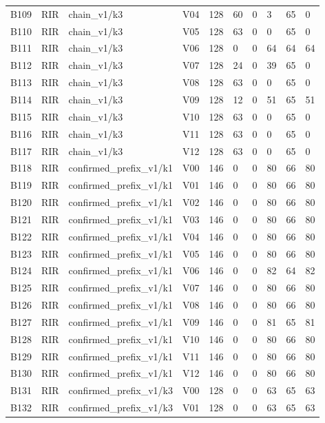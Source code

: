 \begin{longtable}{llllllllll}
B109 & RIR & chain\_v1/k3 & V04 & 128 & 60 & 0 & 3 & 65 & 0 \\
B110 & RIR & chain\_v1/k3 & V05 & 128 & 63 & 0 & 0 & 65 & 0 \\
B111 & RIR & chain\_v1/k3 & V06 & 128 & 0 & 0 & 64 & 64 & 64 \\
B112 & RIR & chain\_v1/k3 & V07 & 128 & 24 & 0 & 39 & 65 & 0 \\
B113 & RIR & chain\_v1/k3 & V08 & 128 & 63 & 0 & 0 & 65 & 0 \\
B114 & RIR & chain\_v1/k3 & V09 & 128 & 12 & 0 & 51 & 65 & 51 \\
B115 & RIR & chain\_v1/k3 & V10 & 128 & 63 & 0 & 0 & 65 & 0 \\
B116 & RIR & chain\_v1/k3 & V11 & 128 & 63 & 0 & 0 & 65 & 0 \\
B117 & RIR & chain\_v1/k3 & V12 & 128 & 63 & 0 & 0 & 65 & 0 \\
B118 & RIR & confirmed\_prefix\_v1/k1 & V00 & 146 & 0 & 0 & 80 & 66 & 80 \\
B119 & RIR & confirmed\_prefix\_v1/k1 & V01 & 146 & 0 & 0 & 80 & 66 & 80 \\
B120 & RIR & confirmed\_prefix\_v1/k1 & V02 & 146 & 0 & 0 & 80 & 66 & 80 \\
B121 & RIR & confirmed\_prefix\_v1/k1 & V03 & 146 & 0 & 0 & 80 & 66 & 80 \\
B122 & RIR & confirmed\_prefix\_v1/k1 & V04 & 146 & 0 & 0 & 80 & 66 & 80 \\
B123 & RIR & confirmed\_prefix\_v1/k1 & V05 & 146 & 0 & 0 & 80 & 66 & 80 \\
B124 & RIR & confirmed\_prefix\_v1/k1 & V06 & 146 & 0 & 0 & 82 & 64 & 82 \\
B125 & RIR & confirmed\_prefix\_v1/k1 & V07 & 146 & 0 & 0 & 80 & 66 & 80 \\
B126 & RIR & confirmed\_prefix\_v1/k1 & V08 & 146 & 0 & 0 & 80 & 66 & 80 \\
B127 & RIR & confirmed\_prefix\_v1/k1 & V09 & 146 & 0 & 0 & 81 & 65 & 81 \\
B128 & RIR & confirmed\_prefix\_v1/k1 & V10 & 146 & 0 & 0 & 80 & 66 & 80 \\
B129 & RIR & confirmed\_prefix\_v1/k1 & V11 & 146 & 0 & 0 & 80 & 66 & 80 \\
B130 & RIR & confirmed\_prefix\_v1/k1 & V12 & 146 & 0 & 0 & 80 & 66 & 80 \\
B131 & RIR & confirmed\_prefix\_v1/k3 & V00 & 128 & 0 & 0 & 63 & 65 & 63 \\
B132 & RIR & confirmed\_prefix\_v1/k3 & V01 & 128 & 0 & 0 & 63 & 65 & 63 \\

\end{longtable}
